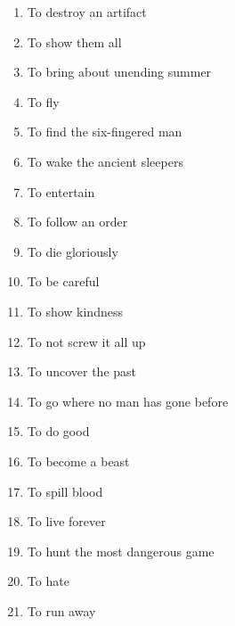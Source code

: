 \begin{enumerate}
\item To destroy an artifact
\item To show them all
\item To bring about unending summer
\item To fly
\item To find the six-fingered man
\item To wake the ancient sleepers
\item To entertain
\item To follow an order
\item To die gloriously
\item To be careful
\item To show kindness
\item To not screw it all up
\item To uncover the past
\item To go where no man has gone before
\item To do good
\item To become a beast
\item To spill blood
\item To live forever
\item To hunt the most dangerous game
\item To hate
\item To run away

\end{enumerate}
